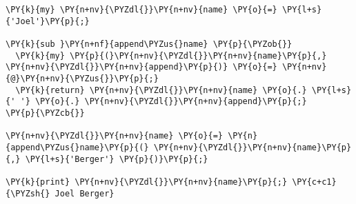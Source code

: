 \begin{Verbatim}[commandchars=\\\{\}]
\PY{k}{my} \PY{n+nv}{\PYZdl{}}\PY{n+nv}{name} \PY{o}{=} \PY{l+s}{'Joel'}\PY{p}{;}

\PY{k}{sub }\PY{n+nf}{append\PYZus{}name} \PY{p}{\PYZob{}}
  \PY{k}{my} \PY{p}{(}\PY{n+nv}{\PYZdl{}}\PY{n+nv}{name}\PY{p}{,} \PY{n+nv}{\PYZdl{}}\PY{n+nv}{append}\PY{p}{)} \PY{o}{=} \PY{n+nv}{@}\PY{n+nv}{\PYZus{}}\PY{p}{;}
  \PY{k}{return} \PY{n+nv}{\PYZdl{}}\PY{n+nv}{name} \PY{o}{.} \PY{l+s}{' '} \PY{o}{.} \PY{n+nv}{\PYZdl{}}\PY{n+nv}{append}\PY{p}{;}
\PY{p}{\PYZcb{}}

\PY{n+nv}{\PYZdl{}}\PY{n+nv}{name} \PY{o}{=} \PY{n}{append\PYZus{}name}\PY{p}{(} \PY{n+nv}{\PYZdl{}}\PY{n+nv}{name}\PY{p}{,} \PY{l+s}{'Berger'} \PY{p}{)}\PY{p}{;}

\PY{k}{print} \PY{n+nv}{\PYZdl{}}\PY{n+nv}{name}\PY{p}{;} \PY{c+c1}{\PYZsh{} Joel Berger}
\end{Verbatim}
